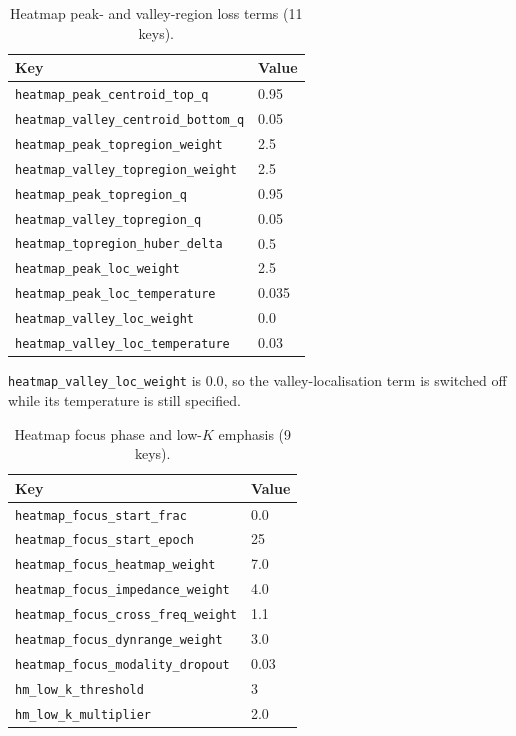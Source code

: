 \begin{table}[htbp]
\centering
\caption{Heatmap peak- and valley-region loss terms (11 keys).}
\label{tab:appb_heatmap_region}
\begin{tabular}{@{}ll@{}}
\hline
Key & Value \\
\hline
\texttt{heatmap\_peak\_centroid\_top\_q} & 0.95 \\
\texttt{heatmap\_valley\_centroid\_bottom\_q} & 0.05 \\
\texttt{heatmap\_peak\_topregion\_weight} & 2.5 \\
\texttt{heatmap\_valley\_topregion\_weight} & 2.5 \\
\texttt{heatmap\_peak\_topregion\_q} & 0.95 \\
\texttt{heatmap\_valley\_topregion\_q} & 0.05 \\
\texttt{heatmap\_topregion\_huber\_delta} & 0.5 \\
\texttt{heatmap\_peak\_loc\_weight} & 2.5 \\
\texttt{heatmap\_peak\_loc\_temperature} & 0.035 \\
\texttt{heatmap\_valley\_loc\_weight} & 0.0 \\
\texttt{heatmap\_valley\_loc\_temperature} & 0.03 \\
\hline
\end{tabular}
\end{table}

\texttt{heatmap\_valley\_loc\_weight} is $0.0$, so the valley-localisation term is
switched off while its temperature is still specified.

\begin{table}[htbp]
\centering
\caption{Heatmap focus phase and low-$K$ emphasis (9 keys).}
\label{tab:appb_heatmap_focus}
\begin{tabular}{@{}ll@{}}
\hline
Key & Value \\
\hline
\texttt{heatmap\_focus\_start\_frac} & 0.0 \\
\texttt{heatmap\_focus\_start\_epoch} & 25 \\
\texttt{heatmap\_focus\_heatmap\_weight} & 7.0 \\
\texttt{heatmap\_focus\_impedance\_weight} & 4.0 \\
\texttt{heatmap\_focus\_cross\_freq\_weight} & 1.1 \\
\texttt{heatmap\_focus\_dynrange\_weight} & 3.0 \\
\texttt{heatmap\_focus\_modality\_dropout} & 0.03 \\
\texttt{hm\_low\_k\_threshold} & 3 \\
\texttt{hm\_low\_k\_multiplier} & 2.0 \\
\hline
\end{tabular}
\end{table}

